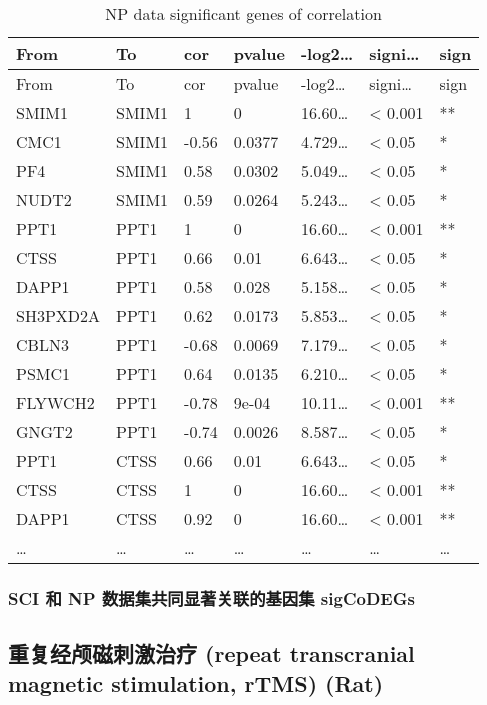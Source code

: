 \documentclass[
]{article}
\begin{document}
\begin{longtable}[]{@{}lllllll@{}}
\caption{\label{tab:NP-data-significant-genes-of-correlation}NP data significant genes of correlation}\tabularnewline
\toprule
From & To & cor & pvalue & -log2\ldots{} & signi\ldots{} & sign\tabularnewline
\midrule
\endfirsthead
\toprule
From & To & cor & pvalue & -log2\ldots{} & signi\ldots{} & sign\tabularnewline
\midrule
\endhead
SMIM1 & SMIM1 & 1 & 0 & 16.60\ldots{} & \textless{} 0.001 & **\tabularnewline
CMC1 & SMIM1 & -0.56 & 0.0377 & 4.729\ldots{} & \textless{} 0.05 & *\tabularnewline
PF4 & SMIM1 & 0.58 & 0.0302 & 5.049\ldots{} & \textless{} 0.05 & *\tabularnewline
NUDT2 & SMIM1 & 0.59 & 0.0264 & 5.243\ldots{} & \textless{} 0.05 & *\tabularnewline
PPT1 & PPT1 & 1 & 0 & 16.60\ldots{} & \textless{} 0.001 & **\tabularnewline
CTSS & PPT1 & 0.66 & 0.01 & 6.643\ldots{} & \textless{} 0.05 & *\tabularnewline
DAPP1 & PPT1 & 0.58 & 0.028 & 5.158\ldots{} & \textless{} 0.05 & *\tabularnewline
SH3PXD2A & PPT1 & 0.62 & 0.0173 & 5.853\ldots{} & \textless{} 0.05 & *\tabularnewline
CBLN3 & PPT1 & -0.68 & 0.0069 & 7.179\ldots{} & \textless{} 0.05 & *\tabularnewline
PSMC1 & PPT1 & 0.64 & 0.0135 & 6.210\ldots{} & \textless{} 0.05 & *\tabularnewline
FLYWCH2 & PPT1 & -0.78 & 9e-04 & 10.11\ldots{} & \textless{} 0.001 & **\tabularnewline
GNGT2 & PPT1 & -0.74 & 0.0026 & 8.587\ldots{} & \textless{} 0.05 & *\tabularnewline
PPT1 & CTSS & 0.66 & 0.01 & 6.643\ldots{} & \textless{} 0.05 & *\tabularnewline
CTSS & CTSS & 1 & 0 & 16.60\ldots{} & \textless{} 0.001 & **\tabularnewline
DAPP1 & CTSS & 0.92 & 0 & 16.60\ldots{} & \textless{} 0.001 & **\tabularnewline
\ldots{} & \ldots{} & \ldots{} & \ldots{} & \ldots{} & \ldots{} & \ldots{}\tabularnewline
\bottomrule
\end{longtable}

\hypertarget{sci-ux548c-np-ux6570ux636eux96c6ux5171ux540cux663eux8457ux5173ux8054ux7684ux57faux56e0ux96c6-sigcodegs}{%
\subsubsection{SCI 和 NP 数据集共同显著关联的基因集 sigCoDEGs}\label{sci-ux548c-np-ux6570ux636eux96c6ux5171ux540cux663eux8457ux5173ux8054ux7684ux57faux56e0ux96c6-sigcodegs}}

\hypertarget{ux91cdux590dux7ecfux9885ux78c1ux523aux6fc0ux6cbbux7597-repeat-transcranial-magnetic-stimulation-rtms-rat}{%
\subsection{重复经颅磁刺激治疗 (repeat transcranial magnetic stimulation, rTMS) (Rat)}\label{ux91cdux590dux7ecfux9885ux78c1ux523aux6fc0ux6cbbux7597-repeat-transcranial-magnetic-stimulation-rtms-rat}}
\end{document}
